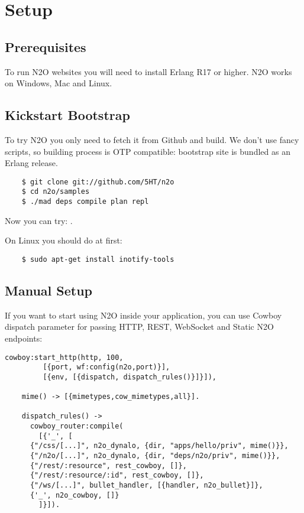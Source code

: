 \section{Setup}

\subsection{Prerequisites}
To run N2O websites you will need to install Erlang R17 or higher.
N2O works on Windows, Mac and Linux.

\subsection{Kickstart Bootstrap}
To try N2O you only need to fetch it from Github and build. We don't use
fancy scripts, so building process is OTP compatible: bootstrap site
is bundled as an Erlang release.

\vspace{1\baselineskip}
\begin{lstlisting}
    $ git clone git://github.com/5HT/n2o
    $ cd n2o/samples
    $ ./mad deps compile plan repl
\end{lstlisting}
\vspace{1\baselineskip}

Now you can try: .

On Linux you should do at first:

\begin{lstlisting}
    $ sudo apt-get install inotify-tools
\end{lstlisting}

\newpage
\subsection{Manual Setup}
If you want to start using N2O inside your application, you can use Cowboy dispatch parameter
for passing HTTP, REST, WebSocket and Static N2O endpoints:

\begin{lstlisting}[caption=web\_sup.erl]
    cowboy:start_http(http, 100,
         [{port, wf:config(n2o,port)}],
         [{env, [{dispatch, dispatch_rules()}]}]),

    mime() -> [{mimetypes,cow_mimetypes,all}].

    dispatch_rules() ->
      cowboy_router:compile(
        [{'_', [
      {"/css/[...]", n2o_dynalo, {dir, "apps/hello/priv", mime()}},
      {"/n2o/[...]", n2o_dynalo, {dir, "deps/n2o/priv", mime()}},
      {"/rest/:resource", rest_cowboy, []},
      {"/rest/:resource/:id", rest_cowboy, []},
      {"/ws/[...]", bullet_handler, [{handler, n2o_bullet}]},
      {'_', n2o_cowboy, []}
        ]}]).
\end{lstlisting}

